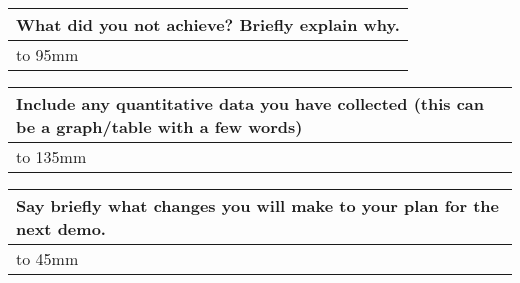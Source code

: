 \documentclass[a4paper]{article}
\newcommand{\colWidth}{141mm}
\begin{document}
\begin{center}

\begin{tabular}{|p{\colWidth}|}
	\hline
	\cellcolor{blue!25}\large
	\textbf{What did you not achieve? Briefly explain why.}
	\\ \hline
	\vtop to 95mm{

  }
  \\
  \hline
\end{tabular}
\vskip 5mm


\begin{tabular}{|p{\colWidth}|}
	\hline
	\cellcolor{blue!25}\large
	\textbf{Include any quantitative data you have collected (this can be a graph/table with a few words)}
	\\ \hline
	\vtop to 135mm{
  }
  \\
  \hline
\end{tabular}
\vskip 5mm


\begin{tabular}{|p{\colWidth}|}
	\hline
	\cellcolor{blue!25}\large
	\textbf{Say briefly what changes you will make to your plan for the next demo.}
	\\ \hline
	\vtop to 45mm{
  	}
  \\
  \hline
\end{tabular}

\end{center}
  
\end{document}
